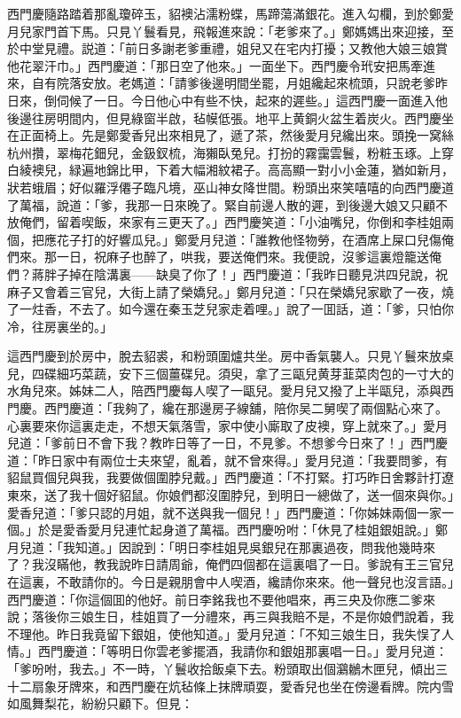 西門慶隨路踏着那亂瓊碎玉，貂襖沾濡粉蝶，馬蹄蕩滿銀花。進入勾欄，到於鄭愛月兒家門首下馬。只見丫鬟看見，飛報進來說：「老爹來了。」鄭媽媽出來迎接，至於中堂見禮。説道：「前日多謝老爹重禮，姐兒又在宅内打擾；又教他大娘三娘賞他花翠汗巾。」西門慶道：「那日空了他來。」一面坐下。西門慶令玳安把馬牽進來，自有院落安放。老媽道：「請爹後邊明間坐罷，月姐纔起來梳頭，只說老爹昨日來，倒伺候了一日。今日他心中有些不快，起來的遲些。」這西門慶一面進入他後邊往房明間内，但見綠窗半啟，毡幙低張。地平上黄銅火盆生着炭火。西門慶坐在正面椅上。先是鄭愛香兒出來相見了，遞了茶，然後愛月兒纔出來。頭挽一窝絲杭州攢，翠梅花鈿兒，金鈒釵梳，海獺臥兔兒。打扮的霧靄雲鬟，粉粧玉琢。上穿白綾襖兒，緑遍地錦比甲，下着大幅湘紋裙子。高高顯一對小小金蓮，猶如新月，狀若蛾眉；好似羅浮僊子臨凡境，巫山神女降世間。粉頭出來笑嘻嘻的向西門慶道了萬福，說道：「爹，我那一日來晚了。緊自前邊人散的遲，到後邊大娘又只顧不放俺們，留着喫飯，來家有三更天了。」西門慶笑道：「小油嘴兒，你倒和李桂姐兩個，把應花子打的好響瓜兒。」鄭愛月兒道：「誰教他怪物勞，在酒席上屎口兒傷俺們來。那一日，祝麻子也醉了，哄我，要送俺們來。我便說，沒爹這裏燈籠送俺們？蔣胖子掉在陰溝裏——缺臭了你了！」西門慶道：「我昨日聽見洪四兒說，祝麻子又會着三官兒，大街上請了榮嬌兒。」鄭月兒道：「只在榮嬌兒家歇了一夜，燒了一炷香，不去了。如今還在秦玉芝兒家走着哩。」說了一囬話，道：「爹，只怕你冷，往房裏坐的。」

這西門慶到於房中，脫去貂裘，和粉頭圍爐共坐。房中香氣襲人。只見丫鬟來放桌兒，四碟細巧菜蔬，安下三個薑碟兒。須臾，拿了三甌兒黄芽韮菜肉包的一寸大的水角兒來。姊妹二人，陪西門慶每人喫了一甌兒。愛月兒又撥了上半甌兒，添與西門慶。西門慶道：「我夠了，纔在那邊房子線舖，陪你吴二舅喫了兩個點心來了。心裏要來你這裏走走，不想天氣落雪，家中使小廝取了皮襖，穿上就來了。」愛月兒道：「爹前日不會下我？教昨日等了一日，不見爹。不想爹今日來了！」西門慶道：「昨日家中有兩位士夫來望，亂着，就不曾來得。」愛月兒道：「我要問爹，有貂鼠買個兒與我，我要做個圍脖兒戴。」西門慶道：「不打緊。打巧昨日舍夥計打遼東來，送了我十個好貂鼠。你娘們都沒圍脖兒，到明日一總做了，送一個來與你。」愛香兒道：「爹只認的月姐，就不送與我一個兒！」西門慶道：「你姊妹兩個一家一個。」於是愛香愛月兒連忙起身道了萬福。西門慶吩咐：「休見了桂姐銀姐說。」鄭月兒道：「我知道。」因說到：「明日李桂姐見吳銀兒在那裏過夜，問我他幾時來了？我沒瞞他，教我說昨日請周爺，俺們四個都在這裏唱了一日。爹說有王三官兒在這裏，不敢請你的。今日是親朋會中人喫酒，纔請你來來。他一聲兒也沒言語。」西門慶道：「你這個囬的他好。前日李銘我也不要他唱來，再三央及你應二爹來說；落後你三娘生日，桂姐買了一分禮來，再三與我賠不是，不是你娘們說着，我不理他。昨日我竟留下銀姐，使他知道。」愛月兒道：「不知三娘生日，我失悮了人情。」西門慶道：「等明日你雲老爹擺酒，我請你和銀姐那裏唱一日。」愛月兒道：「爹吩咐，我去。」不一時，丫鬟收拾飯桌下去。粉頭取出個鸂鶒木匣兒，傾出三十二扇象牙牌來，和西門慶在炕毡條上抹牌頑耍，愛香兒也坐在傍邊看牌。院内雪如風舞梨花，紛紛只顧下。但見：

